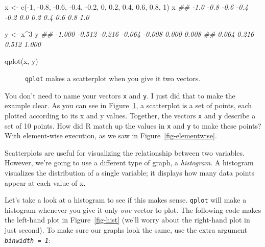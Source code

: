 \documentclass[
  letterpaper,
  DIV=11,
  numbers=noendperiod]{scrbook}
\makeatletter
\newenvironment{Shaded}{\begin{snugshade}}{\end{snugshade}}
\newcommand{\DecValTok}[1]{\textcolor[rgb]{0.68,0.00,0.00}{#1}}
\newcommand{\DocumentationTok}[1]{\textcolor[rgb]{0.37,0.37,0.37}{\textit{#1}}}
\newcommand{\FloatTok}[1]{\textcolor[rgb]{0.68,0.00,0.00}{#1}}
\newcommand{\FunctionTok}[1]{\textcolor[rgb]{0.28,0.35,0.67}{#1}}
\newcommand{\NormalTok}[1]{\textcolor[rgb]{0.00,0.23,0.31}{#1}}
\newcommand{\OtherTok}[1]{\textcolor[rgb]{0.00,0.23,0.31}{#1}}
\newcommand{\SpecialCharTok}[1]{\textcolor[rgb]{0.37,0.37,0.37}{#1}}
\newcommand*\pandocbounded[1]{%
  \sbox\pandoc@box{#1}%
  \Gscale@div\@tempa{\textheight}{\dimexpr\ht\pandoc@box+\dp\pandoc@box\relax}%
  \Gscale@div\@tempb{\linewidth}{\wd\pandoc@box}%
  \ifdim\@tempb\p@<\@tempa\p@\let\@tempa\@tempb\fi%
  \ifdim\@tempa\p@<\p@\scalebox{\@tempa}{\usebox\pandoc@box}%
  \else\usebox{\pandoc@box}%
  \fi%
}
\makeatother
\begin{document}
\begin{Shaded}
\begin{Highlighting}[]
\NormalTok{x }\OtherTok{\textless{}{-}} \FunctionTok{c}\NormalTok{(}\SpecialCharTok{{-}}\DecValTok{1}\NormalTok{, }\SpecialCharTok{{-}}\FloatTok{0.8}\NormalTok{, }\SpecialCharTok{{-}}\FloatTok{0.6}\NormalTok{, }\SpecialCharTok{{-}}\FloatTok{0.4}\NormalTok{, }\SpecialCharTok{{-}}\FloatTok{0.2}\NormalTok{, }\DecValTok{0}\NormalTok{, }\FloatTok{0.2}\NormalTok{, }\FloatTok{0.4}\NormalTok{, }\FloatTok{0.6}\NormalTok{, }\FloatTok{0.8}\NormalTok{, }\DecValTok{1}\NormalTok{)}
\NormalTok{x}
\DocumentationTok{\#\# {-}1.0 {-}0.8 {-}0.6 {-}0.4 {-}0.2  0.0  0.2  0.4  0.6  0.8  1.0}

\NormalTok{y }\OtherTok{\textless{}{-}}\NormalTok{ x}\SpecialCharTok{\^{}}\DecValTok{3}
\NormalTok{y}
\DocumentationTok{\#\# {-}1.000 {-}0.512 {-}0.216 {-}0.064 {-}0.008  0.000  0.008}
\DocumentationTok{\#\#  0.064  0.216  0.512  1.000}

\FunctionTok{qplot}\NormalTok{(x, y)}
\end{Highlighting}
\end{Shaded}

\begin{figure}

\centering{

\pandocbounded{\texttt{[image: images/hopr\_0201.png]}}

}

\caption{\label{fig-qplot}\texttt{qplot} makes a scatterplot when you
give it two vectors.}

\end{figure}%

You don't need to name your vectors \texttt{x} and \texttt{y}. I just
did that to make the example clear. As you can see in
Figure~\ref{fig-qplot}, a scatterplot is a set of points, each plotted
according to its x and y values. Together, the vectors \texttt{x} and
\texttt{y} describe a set of 10 points. How did R match up the values in
\texttt{x} and \texttt{y} to make these points? With element-wise
execution, as we saw in Figure~\ref{fig-elementwise}.

Scatterplots are useful for visualizing the relationship between two
variables. However, we're going to use a different type of graph, a
\emph{histogram}. A histogram visualizes the distribution of a single
variable; it displays how many data points appear at each value of x.

Let's take a look at a histogram to see if this makes sense.
\texttt{qplot} will make a histogram whenever you give it only
\emph{one} vector to plot. The following code makes the left-hand plot
in Figure~\ref{fig-hist} (we'll worry about the right-hand plot in just
second). To make sure our graphs look the same, use the extra argument
\emph{\texttt{binwidth\ =\ 1}}:
\end{document}
